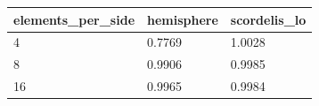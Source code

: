 \begin{tabular}{lll}
\toprule
elements\_per\_side & hemisphere & scordelis\_lo \\
\midrule
4 & 0.7769 & 1.0028 \\
8 & 0.9906 & 0.9985 \\
16 & 0.9965 & 0.9984 \\
\bottomrule
\end{tabular}
